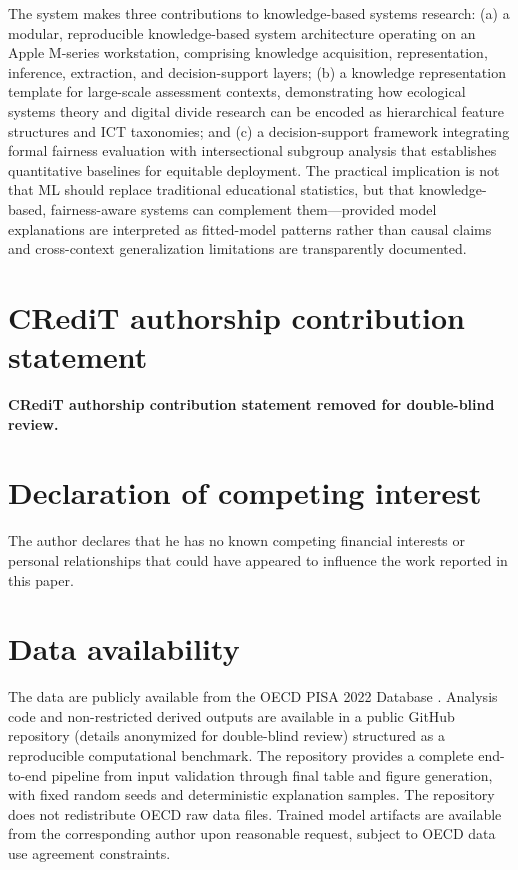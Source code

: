 \documentclass[review,12pt]{elsarticle}
\begin{document}
The system makes three contributions to knowledge-based systems research: (a) a modular, reproducible knowledge-based system architecture operating on an Apple M-series workstation, comprising knowledge acquisition, representation, inference, extraction, and decision-support layers; (b) a knowledge representation template for large-scale assessment contexts, demonstrating how ecological systems theory and digital divide research can be encoded as hierarchical feature structures and ICT taxonomies; and (c) a decision-support framework integrating formal fairness evaluation with intersectional subgroup analysis that establishes quantitative baselines for equitable deployment. The practical implication is not that ML should replace traditional educational statistics, but that knowledge-based, fairness-aware systems can complement them---provided model explanations are interpreted as fitted-model patterns rather than causal claims and cross-context generalization limitations are transparently documented.


\FloatBarrier

\section*{CRediT authorship contribution statement}

\textbf{CRediT authorship contribution statement removed for double-blind review.}

\section*{Declaration of competing interest}

The author declares that he has no known competing financial interests or personal relationships that could have appeared to influence the work reported in this paper.

\section*{Data availability}

The data are publicly available from the OECD PISA 2022 Database \citep{OECD_2022_database}. Analysis code and non-restricted derived outputs are available in a public GitHub repository (details anonymized for double-blind review) structured as a reproducible computational benchmark. The repository provides a complete end-to-end pipeline from input validation through final table and figure generation, with fixed random seeds and deterministic explanation samples. The repository does not redistribute OECD raw data files. Trained model artifacts are available from the corresponding author upon reasonable request, subject to OECD data use agreement constraints.
\end{document}
